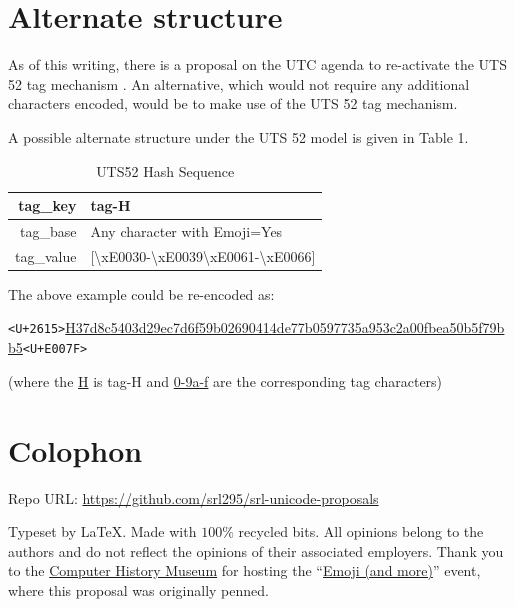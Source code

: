 \documentclass[12pt]{article}
\begin{document}
\clearpage

\section{Alternate structure}

As of this writing, there is a proposal on the UTC agenda to re-activate the UTS 52 tag mechanism \autocite{L216226}.
An alternative, which would not require any additional characters encoded, would be to make use of the UTS 52 tag mechanism.

A possible alternate structure under the UTS 52 model is given in Table 1.



\begin{table}[]
\centering
\caption{UTS52 Hash Sequence}
\begin{tabular}{| r | l |}
\hline
	tag\_key	&	tag-H \\
\hline
	tag\_base	&	Any character with Emoji=Yes \\
\hline
	tag\_value	&	[\textbackslash{}x{E0030}-\textbackslash{}x{E0039}\textbackslash{}x{E0061}-\textbackslash{}x{E0066}]\+  \\
\hline
	
\end{tabular}
\end{table}

The above example could be re-encoded as:
	
\texttt{<U+2615>}\underline{H37d8c5403d29ec7d6f59b02690414de77b0597735a953c2a00fbea50b5f79bb5}\texttt{<U+E007F>}

(where the \underline{H} is tag-H  and \underline{0-9a-f} are the corresponding tag characters)



{}
\printbibliography
\section*{Colophon}

Repo URL: \small\url{https://github.com/srl295/srl-unicode-proposals} 


Typeset by \LaTeX . Made with \( 100\%  \) recycled bits. All opinions belong to the authors and do not reflect the opinions
of their associated employers. Thank you to the \href{http://www.computerhistory.org}{Computer History Museum} 
for hosting the ``\href{https://www.facebook.com/events/1727012724179335/}{Emoji (and more)}'' event, where this proposal was originally penned. 
\end{document}
